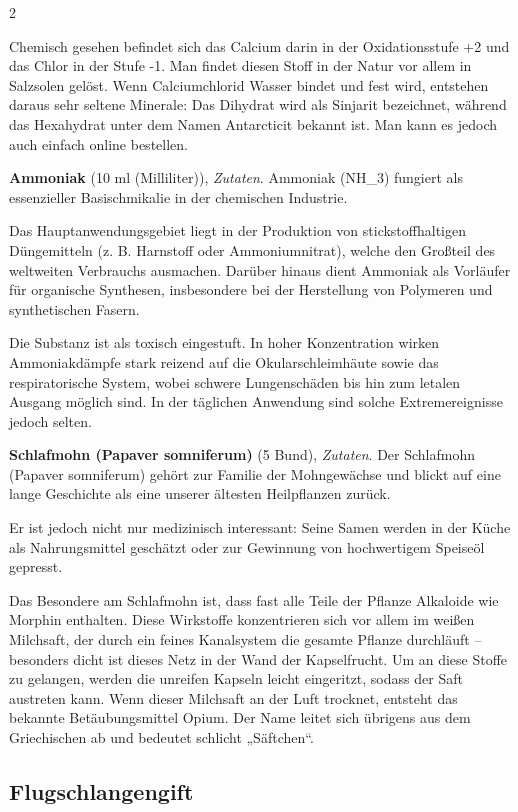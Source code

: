 \begin{multicols}{2}
\begin{denseitemize}
Chemisch gesehen befindet sich das Calcium darin in der Oxidationsstufe +2 und das Chlor in der Stufe -1. Man findet diesen Stoff in der Natur vor allem in Salzsolen gelöst. Wenn Calciumchlorid Wasser bindet und fest wird, entstehen daraus sehr seltene Minerale: Das Dihydrat wird als Sinjarit bezeichnet, während das Hexahydrat unter dem Namen Antarcticit bekannt ist. Man kann es jedoch auch einfach online bestellen.
        \item \textbf{Ammoniak} (10 ml (Milliliter)), \textit{Zutaten}.
        Ammoniak (NH\_3) fungiert als essenzieller Basischmikalie in der chemischen Industrie.

Das Hauptanwendungsgebiet liegt in der Produktion von stickstoffhaltigen Düngemitteln (z. B. Harnstoff oder Ammoniumnitrat), welche den Großteil des weltweiten Verbrauchs ausmachen. Darüber hinaus dient Ammoniak als Vorläufer für organische Synthesen, insbesondere bei der Herstellung von Polymeren und synthetischen Fasern.

Die Substanz ist als toxisch eingestuft. In hoher Konzentration wirken Ammoniakdämpfe stark reizend auf die Okularschleimhäute sowie das respiratorische System, wobei schwere Lungenschäden bis hin zum letalen Ausgang möglich sind. In der täglichen Anwendung sind solche Extremereignisse jedoch selten.
        \item \textbf{Schlafmohn (Papaver somniferum)} (5 Bund), \textit{Zutaten}.
        Der Schlafmohn (Papaver somniferum) gehört zur Familie der Mohngewächse und blickt auf eine lange Geschichte als eine unserer ältesten Heilpflanzen zurück.

Er ist jedoch nicht nur medizinisch interessant: Seine Samen werden in der Küche als Nahrungsmittel geschätzt oder zur Gewinnung von hochwertigem Speiseöl gepresst.

Das Besondere am Schlafmohn ist, dass fast alle Teile der Pflanze Alkaloide wie Morphin enthalten. Diese Wirkstoffe konzentrieren sich vor allem im weißen Milchsaft, der durch ein feines Kanalsystem die gesamte Pflanze durchläuft – besonders dicht ist dieses Netz in der Wand der Kapselfrucht. Um an diese Stoffe zu gelangen, werden die unreifen Kapseln leicht eingeritzt, sodass der Saft austreten kann. Wenn dieser Milchsaft an der Luft trocknet, entsteht das bekannte Betäubungsmittel Opium. Der Name leitet sich übrigens aus dem Griechischen ab und bedeutet schlicht „Säftchen“.
    \end{denseitemize}


    \subsection*{Flugschlangengift}


\end{multicols}
